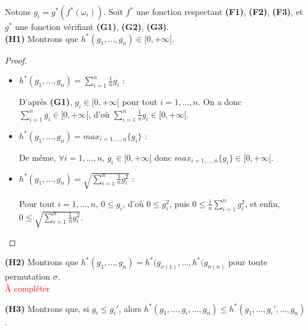 \documentclass[a4paper]{article}
\begin{document}
Notons $g_i = g^*(f^*(\omega_i))$. Soit $f^*$ une fonction respectant
\textbf{(F1)}, \textbf{(F2)}, \textbf{(F3)}, et $g^*$ une fonction vérifiant
\textbf{(G1)}, \textbf{(G2)}, \textbf{(G3)}. \\
 
\textbf{(H1)} Montrons que $h^*(g_1,...,g_n) \in [0,+\infty[$.

\begin{proof}
        \begin{itemize}
        \item $h^*(g_1,...,g_n) = \sum_{i=1}^{n} \frac{1}{n} g_i$ :

            D'après \textbf{(G1)}, $g_i \in [0,+\infty[$ pour tout $i=1,...,n$.
            On a donc $\sum_{i=1}^{n} g_i \in [0,+\infty[$, d'où $\sum_{i=1}^{n}
            \frac{1}{n} g_i \in [0,+\infty[$.

        \item $h^*(g_1,...,g_n) = max_{i=1,...,n} \{g_i\}$ :
            
            De même, $\forall i=1,...,n$, $g_i \in [0,+\infty[$ donc
            $max_{i=1,...,n}\{g_i\} \in [0,+\infty[$.

        \item $h^*(g_1,...,g_n) = \sqrt{\sum_{i=1}^{n} \frac{1}{n} g_i^2}$ :
            
            Pour tout $i=1,...,n$, $0 \leq g_i$, d'où $0 \leq g_i^2$, puis $0
                \leq \frac{1}{n} \sum_{i=1}^{n} g_i^2$, et enfin, $0 \leq
                \sqrt{\sum_{i=1}^{n} \frac{1}{n} g_i^2}$.

    \end{itemize}
\end{proof}

\textbf{(H2)} Montrons que $h^*(g_1,...,g_n) = h^*(g_{\sigma
(1)},...,h^*(g_{\sigma (n)}$ pour toute permutation $\sigma$.\\

\textcolor{red}{À compléter} %

\textbf{(H3)} Montrons que, si $g_i \leq g_i'$, alors $h^*(g_1,...,g_i,...,g_n)
\leq h^*(g_1,...,g_i',...,g_n)$. \\
\end{document}

